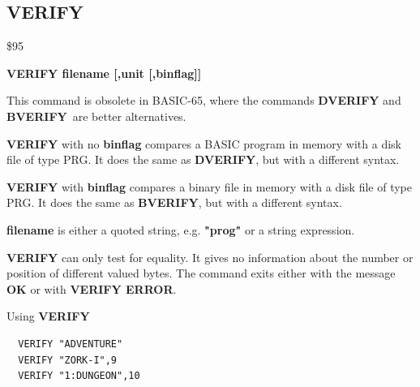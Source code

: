 \subsection{VERIFY}
\begin{description}[leftmargin=2cm,style=nextline]
\item [Token:] \$95
\item [Format:] {\bf VERIFY filename [,unit [,binflag]] }
\item [Usage:]
   This command is obsolete in BASIC-65, where the commands
   {\bf DVERIFY} and {\bf BVERIFY} are better alternatives.

   {\bf VERIFY} with no {\bf binflag} compares a BASIC program
   in memory with a disk file of type PRG.
   It does the same as {\bf DVERIFY}, but with a different syntax.

   {\bf VERIFY} with {\bf binflag} compares a binary file
   in memory with a disk file of type PRG.
   It does the same as {\bf BVERIFY}, but with a different syntax.

   {\bf filename} is either a quoted string, e.g. {\bf "prog"} or
   a string expression.

   \unitdefinition

\item [Remarks:]
   {\bf VERIFY} can only test for equality. It gives no information
   about the number or position of different valued bytes.
   The command exits either with the message {\bf OK}
   or with {\bf VERIFY ERROR}.

\item [Example:] Using {\bf VERIFY}
\begin{tcolorbox}[colback=black,coltext=white]
\verbatimfont{\codefont}
\begin{verbatim}
  VERIFY "ADVENTURE"
  VERIFY "ZORK-I",9
  VERIFY "1:DUNGEON",10
\end{verbatim}
\end{tcolorbox}
\end{description}


\newpage
